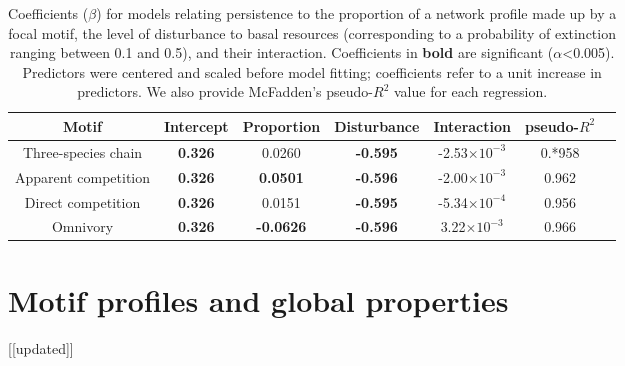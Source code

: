 \documentclass[12pt]{article}
\begin{document}
\begin{spacing}{2.0}
    \begin{table}[hb!]
        \caption{Coefficients ($\beta$) for models relating persistence to the proportion of a network profile made up by a focal motif, the level of disturbance to basal resources (corresponding to a probability of extinction ranging between 0.1 and 0.5), and their interaction. Coefficients in \textbf{bold} are significant ($\alpha$\textless0.005). Predictors were centered and scaled before model fitting; coefficients refer to a unit increase in predictors. We also provide McFadden's pseudo-$R^2$ value for each regression. }
        \label{motif_profile_tab}
        \centering
        \footnotesize
        \begin{tabular}{c|c c c c c | c }
        Motif & Intercept & Proportion & Disturbance & Interaction &  pseudo-$R^2$ \\
            \hline
            Three-species chain & \textbf{0.326} &  0.0260 & \textbf{-0.595} & -2.53$\times10^{-3}$ & 0.*958 \\
            Apparent competition & \textbf{0.326} & \textbf{0.0501} & \textbf{-0.596} & -2.00$\times10^{-3}$ & 0.962 \\
            Direct competition & \textbf{0.326} & 0.0151 & \textbf{-0.595} & -5.34$\times10^{-4}$ & 0.956 \\
            Omnivory & \textbf{0.326} & \textbf{-0.0626} & \textbf{-0.596} & 3.22$\times10^{-3}$ & 0.966 \\
        \end{tabular}
    \end{table}
\clearpage


\section{Motif profiles and global properties} [[updated]]


\end{spacing}
\end{document}

